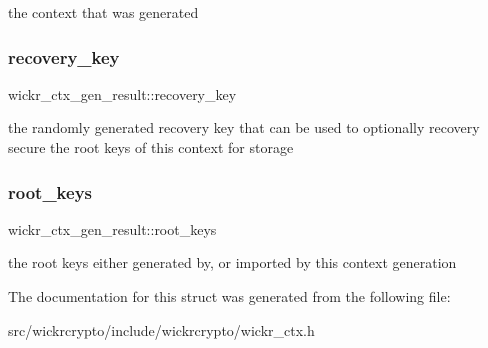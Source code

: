 the context that was generated \mbox{\label{structwickr__ctx__gen__result_a32feaf76def6c13abe0240c6ae669999}} 
\subsubsection{\texorpdfstring{recovery\_key}{recovery\_key}}
{\footnotesize\ttfamily wickr\+\_\+ctx\+\_\+gen\+\_\+result\+::recovery\+\_\+key}

the randomly generated recovery key that can be used to optionally recovery secure the root keys of this context for storage \mbox{\label{structwickr__ctx__gen__result_a42600241a65a968de4f84120d9031320}} 
\subsubsection{\texorpdfstring{root\_keys}{root\_keys}}
{\footnotesize\ttfamily wickr\+\_\+ctx\+\_\+gen\+\_\+result\+::root\+\_\+keys}

the root keys either generated by, or imported by this context generation 

The documentation for this struct was generated from the following file\+:\begin{DoxyCompactItemize}
\item 
src/wickrcrypto/include/wickrcrypto/wickr\+\_\+ctx.\+h\end{DoxyCompactItemize}
